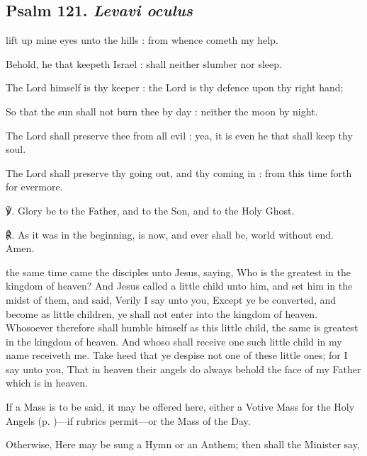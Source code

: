 \clearpage
\subsection{Psalm 121. \textit{Levavi oculus}}
 lift up mine eyes unto the hills : from whence cometh my help.\par
{}
Behold, he that keepeth Israel : shall neither slumber nor sleep.\par
{}The Lord himself is thy keeper : the Lord is thy defence upon thy right hand;\par
{}So that the sun shall not burn thee by day : neither the moon by night.\par
{}The Lord shall preserve thee from all evil : yea, it is even he that shall keep thy soul.\par
{}The Lord shall preserve thy going out, and thy coming in : from this time forth for evermore.\par
℣. Glory be to the Father, and to the Son, and to the Holy Ghost.\par
℟. As it was in the beginning, is now, and ever shall be, world without end. Amen.

  the same time came the disciples unto Jesus, saying, Who is the greatest in the kingdom of heaven? And Jesus called a little child unto him, and set him in the midst of them, and said, Verily I say unto you, Except ye be converted, and become as little children, ye shall not enter into the kingdom of heaven. Whosoever therefore shall humble himself as this little child, the same is greatest in the kingdom of heaven. And whoso shall receive one such little child in my name receiveth me. Take heed that ye despise not one of these little ones; for I say unto you, That in heaven their angels do always behold the face of my Father which is in heaven.

 \begin{rubric}
    If a Mass is to be said, it may be offered here, either a Votive Mass for the Holy Angels (p. \pageref{MassOfTheAngels})---if rubrics permit---or the Mass of the Day.\par
    Otherwise, Here may be sung a Hymn or an Anthem; then shall the Minister say,
\end{rubric}


